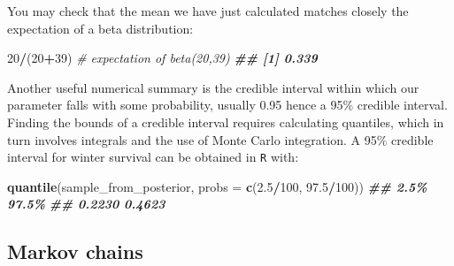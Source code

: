 \documentclass[
  12pt,
]{krantz}
\newenvironment{Shaded}{\begin{snugshade}}{\end{snugshade}}
\newcommand{\AttributeTok}[1]{\textcolor[rgb]{0.13,0.29,0.53}{#1}}
\newcommand{\CommentTok}[1]{\textcolor[rgb]{0.56,0.35,0.01}{\textit{#1}}}
\newcommand{\DecValTok}[1]{\textcolor[rgb]{0.00,0.00,0.81}{#1}}
\newcommand{\DocumentationTok}[1]{\textcolor[rgb]{0.56,0.35,0.01}{\textbf{\textit{#1}}}}
\newcommand{\FloatTok}[1]{\textcolor[rgb]{0.00,0.00,0.81}{#1}}
\newcommand{\FunctionTok}[1]{\textcolor[rgb]{0.13,0.29,0.53}{\textbf{#1}}}
\newcommand{\NormalTok}[1]{#1}
\newcommand{\SpecialCharTok}[1]{\textcolor[rgb]{0.81,0.36,0.00}{\textbf{#1}}}
\begin{document}
You may check that the mean we have just calculated matches closely the expectation of a beta distribution:

\begin{Shaded}
\begin{Highlighting}[]
\DecValTok{20}\SpecialCharTok{/}\NormalTok{(}\DecValTok{20}\SpecialCharTok{+}\DecValTok{39}\NormalTok{) }\CommentTok{\# expectation of beta(20,39)}
\DocumentationTok{\#\# [1] 0.339}
\end{Highlighting}
\end{Shaded}

Another useful numerical summary is the credible interval within which our parameter falls with some probability, usually 0.95 hence a 95\(\%\) credible interval. Finding the bounds of a credible interval requires calculating quantiles, which in turn involves integrals and the use of Monte Carlo integration. A 95\(\%\) credible interval for winter survival can be obtained in \texttt{R} with:

\begin{Shaded}
\begin{Highlighting}[]
\FunctionTok{quantile}\NormalTok{(sample\_from\_posterior, }\AttributeTok{probs =} \FunctionTok{c}\NormalTok{(}\FloatTok{2.5}\SpecialCharTok{/}\DecValTok{100}\NormalTok{, }\FloatTok{97.5}\SpecialCharTok{/}\DecValTok{100}\NormalTok{))}
\DocumentationTok{\#\#   2.5\%  97.5\% }
\DocumentationTok{\#\# 0.2230 0.4623}
\end{Highlighting}
\end{Shaded}

\subsection{Markov chains}\label{markovmodelmcmc}
\end{document}
